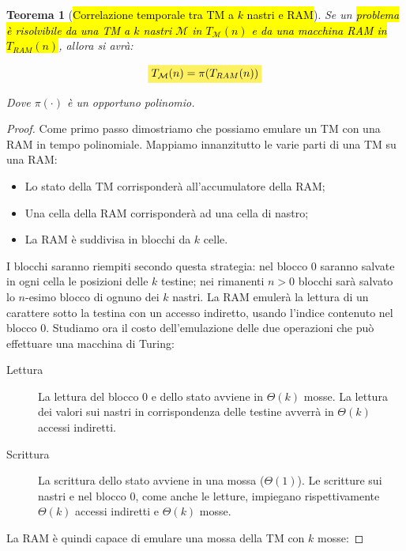 \documentclass[a4paper,11pt,oneside]{article}
\theoremstyle{plain}
\newtheorem{thm}{Teorema}[section]
\theoremstyle{definition}
\theoremstyle{remark}
\newcommand{\mhl}[1]{\colorbox{hlcolor}{$\displaystyle #1$}}
\begin{document}
\begin{thm}[\hl{Correlazione temporale tra TM a $k$ nastri e RAM}]\label{thm:corr-tm-ram}
  Se un \hl{problema è risolvibile da una TM a $k$ nastri $\mathcal{M}$ in
  $T_\mathcal{M}(n)$ e da una macchina RAM in $T_{RAM}(n)$}, allora si avrà:

  \begin{equation}
    \mhl{ T_\mathcal{M}(n) = \pi(T_{RAM}(n)) }
  \end{equation}

  Dove $\pi(\cdot)$ è un opportuno polinomio.
\end{thm}
\begin{proof}
  Come primo passo dimostriamo che possiamo emulare un TM con una RAM in tempo
  polinomiale. Mappiamo innanzitutto le varie parti di una TM su una RAM\@:

  \begin{itemize}
    \item Lo stato della TM corrisponderà all'accumulatore della RAM\@;
    \item Una cella della RAM corrisponderà ad una cella di nastro;
    \item La RAM è suddivisa in blocchi da $k$ celle.
  \end{itemize}

  I blocchi saranno riempiti secondo questa strategia: nel blocco $0$ saranno
  salvate in ogni cella le posizioni delle $k$ testine; nei rimanenti $n>0$
  blocchi sarà salvato lo $n$-esimo blocco di ognuno dei $k$ nastri. La RAM
  emulerà la lettura di un carattere sotto la testina con un accesso indiretto,
  usando l'indice contenuto nel blocco $0$. Studiamo ora il costo
  dell'emulazione delle due operazioni che può effettuare una macchina di
  Turing:

  \begin{description}
    \item[Lettura] La lettura del blocco $0$ e dello stato avviene in
      $\Theta(k)$ mosse. La lettura dei valori sui nastri in corrispondenza
      delle testine avverrà in $\Theta(k)$ accessi indiretti.
    \item[Scrittura] La scrittura dello stato avviene in una mossa
      ($\Theta(1)$). Le scritture sui nastri e nel blocco $0$, come anche le
      letture, impiegano rispettivamente $\Theta(k)$ accessi indiretti e
      $\Theta(k)$ mosse.
  \end{description}

  La RAM è quindi capace di emulare una mossa della TM con $k$ mosse:


\end{proof}
\end{document}
